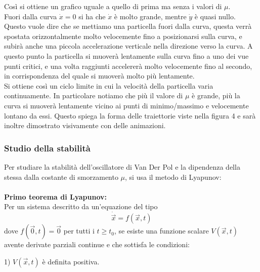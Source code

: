 \documentclass[12pt]{article}
\newcommand{\vo}{\vec{0}}
\begin{document}
Così si ottiene un grafico uguale a quello di prima ma senza i valori di $\mu$. \\
Fuori dalla curva $\dot{x} = 0$ si ha che $\dot{x}$ è molto grande, mentre $\dot{y}$ è quasi nullo. Questo vuole dire che se mettiamo una particella fuori dalla curva, questa verrà spostata orizzontalmente molto velocemente fino a posizionarsi sulla curva, e subirà anche una piccola accelerazione verticale nella direzione verso la curva. A questo punto la particella si muoverà lentamente sulla curva fino a uno dei vue punti critici, e una volta raggiunti accelererà molto velocemente fino al secondo, in corrispondenza del quale si muoverà molto più lentamente. \\
Si ottiene così un ciclo limite in cui la velocità della particella varia continuamente. In particolare notiamo che più il valore di $\mu$ è grande, più la curva si muoverà lentamente vicino ai punti di minimo/massimo e velocemente lontano da essi. Questo spiega la forma delle traiettorie viste nella figura 4 e sarà inoltre dimostrato visivamente con delle animazioni.
\subsubsection{Studio della stabilità }
Per studiare la stabilità dell'oscillatore di Van Der Pol e la dipendenza della stessa dalla costante di smorzamento $\mu$, si usa il metodo di Lyapunov: \\ \\
\textbf{Primo teorema di Lyapunov: \\}
Per un sistema descritto da un'equazione del tipo 
\begin{equation}
	\dot{\vec{x}} = f(\vec{x},t)
\end{equation}
dove $f(\vo,t) = \vo$ per tutti i $t \geq t_0$, se esiste una funzione scalare $V(\vec{x},t)$ avente derivate parziali continue e che sottisfa le condizioni: 

1) $V(\vec{x},t)$ è definita positiva. 
\end{document}
